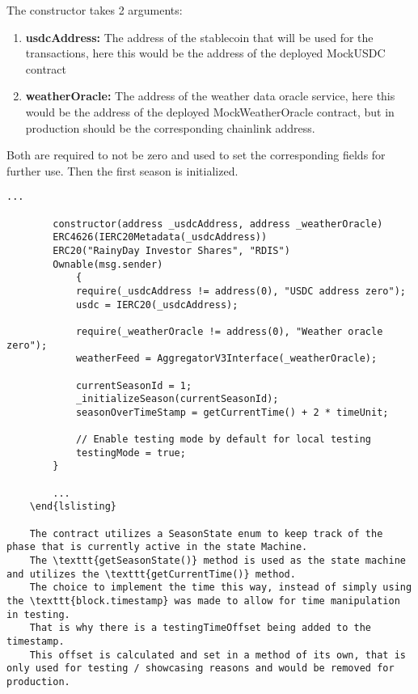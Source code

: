 \documentclass[11pt,a4paper]{article}
\begin{document}
    The constructor takes 2 arguments:
    \begin{enumerate}[(1)]
        \item \textbf{usdcAddress:} The address of the stablecoin that will be used for the transactions, here this would be the address of the deployed MockUSDC contract
        \item \textbf{weatherOracle:} The address of the weather data oracle service, here this would be the address of the deployed MockWeatherOracle contract, but in production should be the corresponding chainlink address.
    \end{enumerate}

    Both are required to not be zero and used to set the corresponding fields for further use.
    Then the first season is initialized.

    \begin{lstlisting}[style=soliditystyle, caption={RainyDayFund.sol - Main Insurance Contract},label={lst:lstlisting1}]
        ...

        constructor(address _usdcAddress, address _weatherOracle)
        ERC4626(IERC20Metadata(_usdcAddress))
        ERC20("RainyDay Investor Shares", "RDIS")
        Ownable(msg.sender)
            {
            require(_usdcAddress != address(0), "USDC address zero");
            usdc = IERC20(_usdcAddress);

            require(_weatherOracle != address(0), "Weather oracle zero");
            weatherFeed = AggregatorV3Interface(_weatherOracle);

            currentSeasonId = 1;
            _initializeSeason(currentSeasonId);
            seasonOverTimeStamp = getCurrentTime() + 2 * timeUnit;

            // Enable testing mode by default for local testing
            testingMode = true;
        }

        ...
    \end{lslisting}

    The contract utilizes a SeasonState enum to keep track of the phase that is currently active in the state Machine.
    The \texttt{getSeasonState()} method is used as the state machine and utilizes the \texttt{getCurrentTime()} method.
    The choice to implement the time this way, instead of simply using the \texttt{block.timestamp} was made to allow for time manipulation in testing.
    That is why there is a testingTimeOffset being added to the timestamp.
    This offset is calculated and set in a method of its own, that is only used for testing / showcasing reasons and would be removed for production.


\end{lstlisting}
\end{document}
